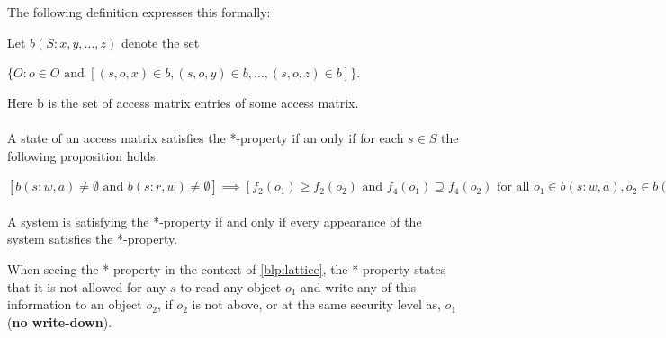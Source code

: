 The following definition expresses this formally:
\begin{definition}
Let $b(S:x,y, \dots, z)$ denote the set 

$\{O: o \in O \text{ and } [(s,o,x) \in b, (s,o,y) \in b, \dots, (s,o,z) \in b]\}$.

Here b is the set of access matrix entries of some access matrix.

\paragraph{}
\noindent{} 
A state of an access matrix satisfies the *-property if an only if for each $s \in S$ the following proposition holds.

$[b(s:w,a) \ne \emptyset \text{ and } b(s:r,w) \ne \emptyset] \implies [f_2(o_1) \ge f_2(o_2) \text{ and } f_4(o_1) \supseteq f_4(o_2) \text{ for all } o_1 \in b(s:w,a), o_2 \in b(s:r,w)]$

\paragraph{}
\noindent{} 
A system is satisfying the *-property if and only if every appearance of the system satisfies the *-property.
\end{definition}

When seeing the *-property in the context of \cref{blp:lattice}, the *-property states that it is not allowed for any \ssubject{} $s$ to read any object $o_1$ and write any of this information to an object $o_2$, if $o_2$ is not above, or at the same security level as, $o_1$ (\textbf{no write-down}).
